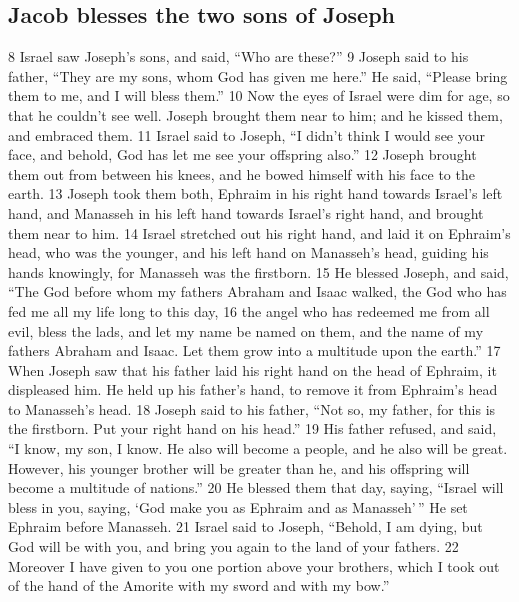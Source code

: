 \hypertarget{jacob-blesses-the-two-sons-of-joseph}{%
\subsection{Jacob blesses the two sons of
Joseph}\label{jacob-blesses-the-two-sons-of-joseph}}

{8} Israel saw Joseph's sons, and said, ``Who are these?'' {9} Joseph
said to his father, ``They are my sons, whom God has given me here.'' He
said, ``Please bring them to me, and I will bless them.'' {10} Now the
eyes of Israel were dim for age, so that he couldn't see well. Joseph
brought them near to him; and he kissed them, and embraced them. {11}
Israel said to Joseph, ``I didn't think I would see your face, and
behold, God has let me see your offspring also.'' {12} Joseph brought
them out from between his knees, and he bowed himself with his face to
the earth. {13} Joseph took them both, Ephraim in his right hand towards
Israel's left hand, and Manasseh in his left hand towards Israel's right
hand, and brought them near to him. {14} Israel stretched out his right
hand, and laid it on Ephraim's head, who was the younger, and his left
hand on Manasseh's head, guiding his hands knowingly, for Manasseh was
the firstborn. {15} He blessed Joseph, and said, ``The God before whom
my fathers Abraham and Isaac walked, the God who has fed me all my life
long to this day, {16} the angel who has redeemed me from all evil,
bless the lads, and let my name be named on them, and the name of my
fathers Abraham and Isaac. Let them grow into a multitude upon the
earth.'' {17} When Joseph saw that his father laid his right hand on the
head of Ephraim, it displeased him. He held up his father's hand, to
remove it from Ephraim's head to Manasseh's head. {18} Joseph said to
his father, ``Not so, my father, for this is the firstborn. Put your
right hand on his head.'' {19} His father refused, and said, ``I know,
my son, I know. He also will become a people, and he also will be great.
However, his younger brother will be greater than he, and his offspring
will become a multitude of nations.'' {20} He blessed them that day,
saying, ``Israel will bless in you, saying, `God make you as Ephraim and
as Manasseh'\,'' He set Ephraim before Manasseh. {21} Israel said to
Joseph, ``Behold, I am dying, but God will be with you, and bring you
again to the land of your fathers. {22} Moreover I have given to you one
portion above your brothers, which I took out of the hand of the Amorite
with my sword and with my bow.''

